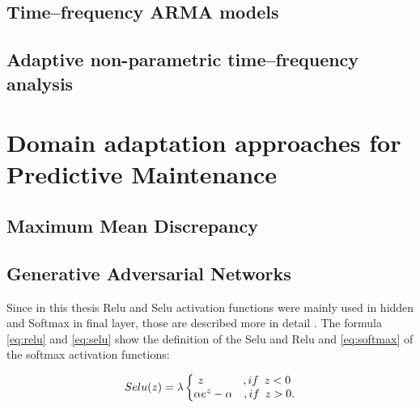 \subsection{Time–frequency ARMA models}
\subsection{Adaptive non-parametric time–frequency analysis}





\section{Domain adaptation approaches for Predictive Maintenance}

\subsection{Maximum Mean Discrepancy}
\subsection{Generative Adversarial Networks}

Since in this thesis Relu and Selu activation functions were mainly used in hidden and Softmax in final layer, those are described more in detail . The formula \ref{eq:relu} and \ref{eq:selu} show the definition of the Selu and Relu and \ref{eq:softmax} of the softmax activation functions: 

\begin{equation}
Selu(z) = \lambda
\left\{
\begin{matrix}
z \hspace{3.5em}, if \enspace z < 0\\
\alpha e^{z} - \alpha  \hspace{1em}, if \enspace z > 0.
\end{matrix}
\right.
\label{eq:selu}
\end{equation}

